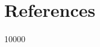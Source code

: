 \documentclass[pdf]{beamer}
\theoremstyle{remark}
\theoremstyle{definition}
\begin{document}

\section{References}

\begin{frame}[t,allowframebreaks]
 10000
\small


\end{frame}
\end{document}
